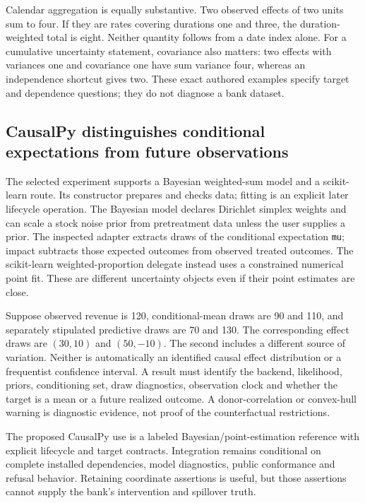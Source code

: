Calendar aggregation is equally substantive. Two observed effects of two
units sum to four. If they are rates covering durations one and three,
the duration-weighted total is eight. Neither quantity follows from a date
index alone. For a cumulative uncertainty statement, covariance also matters:
two effects with variances one and covariance one have sum variance four,
whereas an independence shortcut gives two. These exact authored examples
specify target and dependence questions; they do not diagnose a bank dataset.
\citep{exec25_synthpy_choice}

\subsection{CausalPy distinguishes conditional expectations from future observations}
The selected experiment supports a Bayesian weighted-sum model and a
scikit-learn route. Its constructor prepares and checks data; fitting is
an explicit later lifecycle operation. The Bayesian model declares
Dirichlet simplex weights and can scale a stock noise prior from
pretreatment data unless the user supplies a prior. The inspected adapter
extracts draws of the conditional expectation \texttt{mu}; impact subtracts
those expected outcomes from observed treated outcomes. The scikit-learn
weighted-proportion delegate instead uses a constrained numerical point
fit. These are different uncertainty objects even if their point estimates
are close.\citep{exec25_synthpy_causalpy}

Suppose observed revenue is 120, conditional-mean draws are 90 and 110, and
separately stipulated predictive draws are 70 and 130. The corresponding
effect draws are $(30,10)$ and $(50,-10)$. The second includes a different
source of variation. Neither is automatically an identified causal effect
distribution or a frequentist confidence interval. A result must identify
the backend, likelihood, priors, conditioning set, draw diagnostics,
observation clock and whether the target is a mean or a future realized
outcome. A donor-correlation or convex-hull warning is diagnostic evidence,
not proof of the counterfactual restrictions.\citep{exec25_synthpy_causalpy,
exec25_synthpy_choice}

The proposed CausalPy use is a labeled Bayesian/point-estimation reference
with explicit lifecycle and target contracts. Integration remains conditional
on complete installed dependencies, model diagnostics, public conformance
and refusal behavior. Retaining coordinate assertions is useful, but those
assertions cannot supply the bank's intervention and spillover truth.
\citep{exec25_synthpy_choice}

